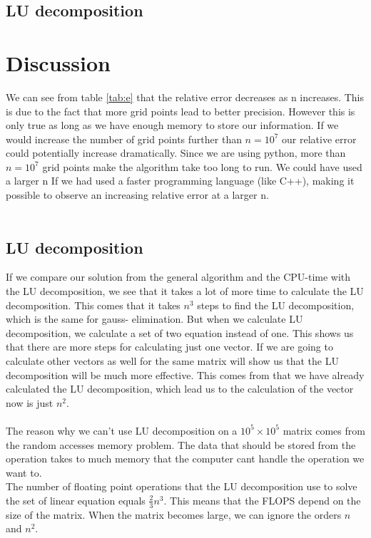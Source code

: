\documentclass[norsk,a4paper,12pt]{article}
\begin{document}
 \subsection{LU decomposition}



 \section{Discussion}
 
 We can see from table \ref{tab:e} that the relative error decreases as n increases. This is due to the fact that more grid points lead to better precision. However this is only true as long as we have enough memory to store our information. If we would increase the number of grid points further than $n=10^7$ our relative error could potentially increase dramatically. Since we are using python, more than $n=10^7$ grid points make the algorithm take too long to run. We could have used a larger n If we had used a faster programming language (like C++), making it possible to observe an increasing relative error at a larger n.\\
 \\
 \subsection{LU decomposition}
  If we compare our solution from the general algorithm and the CPU-time with the LU decomposition, we see that it takes a lot of more time to calculate the LU decomposition. This comes that it takes $n^3$ steps to find the LU decomposition, which is the same for gauss- elimination. But when we calculate LU decomposition, we calculate a set of two equation instead of one. This shows us that there are more steps for calculating just one vector. If we are going to calculate other vectors as well for the same matrix will show us that the LU decomposition will be much more effective. This comes from that we have already calculated the LU decomposition, which lead us to the calculation of the vector now is just $n^2$.    
\\
\\
The reason why we can’t use LU decomposition on a $10^5 \times 10^5$ matrix comes from the random accesses memory problem. The data that should be stored from the operation takes to much memory that the computer cant handle the operation we want to.  
\\

The number of floating point operations that the LU decomposition use to solve the set of linear equation equals $\frac{2}{3} n^3$. This means that the FLOPS depend on the size of the matrix. When the matrix becomes large, we can ignore the orders $n$ and $n^2$.     
  
\end{document}
